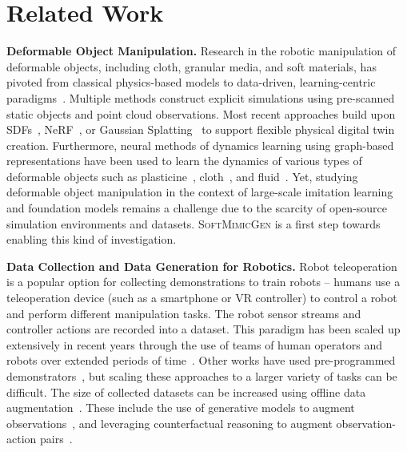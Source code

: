 \documentclass[letterpaper, 10 pt, conference]{ieeeconf}  %
\newcommand{\sysName}{\textsc{SoftMimicGen}\xspace}
\begin{document}
\section{Related Work}


\textbf{Deformable Object Manipulation.}
Research in the robotic manipulation of deformable objects, including cloth, granular media, and soft materials, has pivoted from classical physics-based models to data-driven, learning-centric paradigms~\cite{zhu2022domsurvey,yin2021modeling}. Multiple methods construct explicit simulations using pre-scanned static objects and point cloud observations. Most recent approaches build upon SDFs~\cite{qiao2022neuphysics}, NeRF~\cite{feng2024pie}, or Gaussian Splatting~\cite{zhong2024reconstruction} to support flexible physical digital twin creation. Furthermore, neural methods of dynamics learning using graph-based representations have been used to learn the dynamics of various types of deformable objects such as plasticine~\cite{shi2023robocook}, cloth~\cite{li2020causal}, and fluid~\cite{sanchez2020learning}. Yet, studying deformable object manipulation in the context of large-scale imitation learning and foundation models remains a challenge due to the scarcity of open-source simulation environments and datasets. \sysName is a first step towards enabling this kind of investigation.


\textbf{Data Collection and Data Generation for Robotics.}
Robot teleoperation~\cite{mandlekar2018roboturk, zhao2023learning} is a popular option for collecting demonstrations to train robots -- humans use a teleoperation device (such as a smartphone or VR controller) to control a robot and perform different manipulation tasks. The robot sensor streams and controller actions are recorded into a dataset. This paradigm has been scaled up extensively in recent years through the use of teams of human operators and robots over extended periods of time~\cite{ebert2021bridge, brohan2022rt, o2024open, khazatsky2024droid}. Other works have used pre-programmed demonstrators~\cite{james2020rlbench, zeng2020transporter, wang2023robogen, dalal2023imitating}, but scaling these approaches to a larger variety of tasks can be difficult. The size of collected datasets can be increased using offline data augmentation~\cite{kostrikov2020image, young2020visual, mandlekar2021matters}. These include the use of generative models to augment observations~\cite{yu2023scaling, chen2023genaug}, and leveraging counterfactual reasoning to augment observation-action pairs~\cite{pitis2020counterfactual, pitis2022mocoda}.
\end{document}
